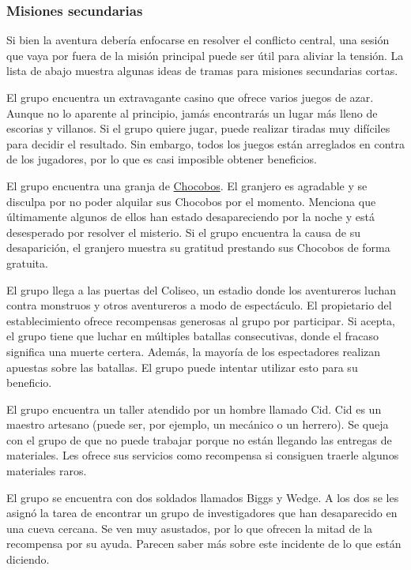 \subsubsection*{Misiones secundarias}
Si bien la aventura debería enfocarse en resolver el conflicto central, una sesión que vaya por fuera de la misión principal puede ser útil para aliviar la tensión. La lista de abajo muestra algunas ideas de tramas para misiones secundarias cortas.
\begin{description}[leftmargin=*]
 \item[\color{accent} Casino:] El grupo encuentra un extravagante casino que ofrece varios juegos de azar. Aunque no lo aparente al principio, jamás encontrarás un lugar más lleno de escorias y villanos. Si el grupo quiere jugar, puede realizar tiradas muy difíciles para decidir el resultado. Sin embargo, todos los juegos están arreglados en contra de los jugadores, por lo que es casi imposible obtener beneficios.
 \item[\color{accent} Granja de Chocobos:] El grupo encuentra una granja de \hyperlink{chocobo}{Chocobos}. El granjero es agradable y se disculpa por no poder alquilar sus Chocobos por el momento. Menciona que últimamente algunos de ellos han estado desapareciendo por la noche y está desesperado por resolver el misterio. Si el grupo encuentra la causa de su desaparición, el granjero muestra su gratitud prestando sus Chocobos de forma gratuita.
 \item[\color{accent} Coliseo:] El grupo llega a las puertas del Coliseo, un estadio donde los aventureros luchan contra monstruos y otros aventureros a modo de espectáculo. El propietario del establecimiento ofrece recompensas generosas al grupo por participar. Si acepta, el grupo tiene que luchar en múltiples batallas consecutivas, donde el fracaso significa una muerte certera. Además, la mayoría de los espectadores realizan apuestas sobre las batallas. El grupo puede intentar utilizar esto para su beneficio.
 \item[\color{accent} Maestro Artesano:] El grupo encuentra un taller atendido por un hombre llamado Cid. Cid es un maestro artesano (puede ser, por ejemplo, un mecánico o un herrero). Se queja con el grupo de que no puede trabajar porque no están llegando las entregas de materiales. Les ofrece sus servicios como recompensa si consiguen traerle algunos materiales raros.
 \item[\color{accent} Cueva Misteriosa:] El grupo se encuentra con dos soldados llamados Biggs y Wedge. A los dos se les asignó la tarea de encontrar un grupo de investigadores que han desaparecido en una cueva cercana. Se ven muy asustados, por lo que ofrecen la mitad de la recompensa por su ayuda. Parecen saber más sobre este incidente de lo que están diciendo.

\end{description}
